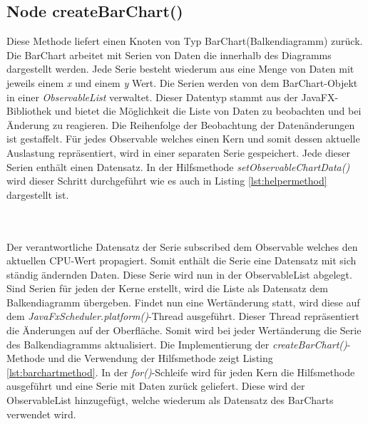 \subsection{Node createBarChart()}
 
Diese Methode liefert einen Knoten von Typ BarChart(Balkendiagramm) zurück. Die BarChart arbeitet mit Serien von Daten die innerhalb des Diagramms dargestellt werden. Jede Serie besteht wiederum aus eine Menge von Daten mit jeweils einem \textit{x} und einem \textit{y} Wert. Die Serien werden von dem BarChart-Objekt in einer \textit{ObservableList} verwaltet. Dieser Datentyp stammt aus der JavaFX-Bibliothek und bietet die Möglichkeit die Liste von Daten zu beobachten und bei Änderung zu reagieren. Die Reihenfolge der Beobachtung der Datenänderungen ist gestaffelt. Für jedes Observable welches einen Kern und somit dessen aktuelle Auslastung repräsentiert, wird in einer separaten Serie gespeichert. Jede dieser Serien enthält einen Datensatz. In der Hilfsmethode \textit{setObservableChartData()} wird dieser Schritt durchgeführt wie es auch in Listing \ref{lst:helpermethod} dargestellt ist. 
 
\\ \\ Der verantwortliche Datensatz der Serie subscribed dem Observable welches den aktuellen CPU-Wert propagiert. Somit enthält die Serie eine Datensatz mit sich ständig ändernden Daten. Diese Serie wird nun in der ObservableList abgelegt. Sind Serien für jeden der Kerne erstellt, wird die Liste als Datensatz dem Balkendiagramm übergeben. Findet nun eine Wertänderung statt, wird diese auf dem \textit{JavaFxScheduler.platform()}-Thread ausgeführt. Dieser Thread repräsentiert die Änderungen auf der Oberfläche. Somit wird bei jeder Wertänderung die Serie des Balkendiagramms aktualisiert. Die Implementierung der \textit{createBarChart()}-Methode und die Verwendung der Hilfsmethode zeigt Listing \ref{lst:barchartmethod}. In der \textit{for()}-Schleife wird für jeden Kern die Hilfsmethode ausgeführt und eine Serie mit Daten zurück geliefert. Diese wird der ObservableList hinzugefügt, welche wiederum als Datensatz des BarCharts verwendet wird.
